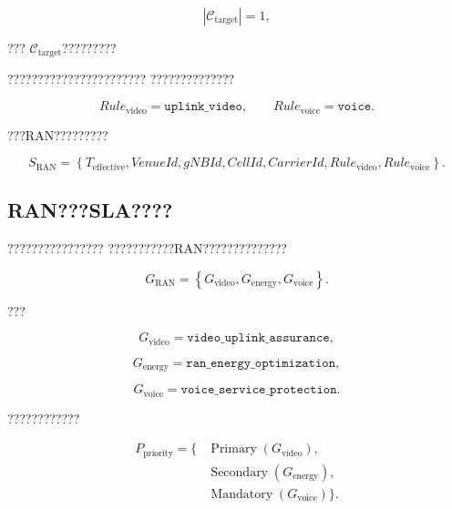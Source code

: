 \begin{equation}
\left|
\mathcal{C}_{\mathrm{target}}
\right|
=
1,
\label{eq:single_cell_scope}
\end{equation}

???
$\mathcal{C}_{\mathrm{target}}$?????????

???????????????????????
??????????????

\begin{equation}
Rule_{\mathrm{video}}
=
\texttt{uplink\_video},
\qquad
Rule_{\mathrm{voice}}
=
\texttt{voice}.
\label{eq:translated_user_rules}
\end{equation}

???RAN?????????

\begin{equation}
S_{\mathrm{RAN}}
=
\left\{
T_{\mathrm{effective}},
VenueId,
gNBId,
CellId,
CarrierId,
Rule_{\mathrm{video}},
Rule_{\mathrm{voice}}
\right\}.
\label{eq:ran_scope_result}
\end{equation}


\subsection*{RAN???SLA????}

????????????????
???????????RAN??????????????

\begin{equation}
G_{\mathrm{RAN}}
=
\left\{
G_{\mathrm{video}},
G_{\mathrm{energy}},
G_{\mathrm{voice}}
\right\}.
\label{eq:translated_ran_objectives}
\end{equation}

???

\begin{equation}
G_{\mathrm{video}}
=
\texttt{video\_uplink\_assurance},
\label{eq:video_assurance_objective}
\end{equation}

\begin{equation}
G_{\mathrm{energy}}
=
\texttt{ran\_energy\_optimization},
\label{eq:energy_optimization_objective}
\end{equation}

\begin{equation}
G_{\mathrm{voice}}
=
\texttt{voice\_service\_protection}.
\label{eq:voice_protection_objective}
\end{equation}

????????????

\begin{equation}
\begin{aligned}
P_{\mathrm{priority}}
=
\{
&\operatorname{Primary}
(G_{\mathrm{video}}),
\\
&\operatorname{Secondary}
(G_{\mathrm{energy}}),
\\
&\operatorname{Mandatory}
(G_{\mathrm{voice}})
\}.
\end{aligned}
\label{eq:translated_objective_priority}
\end{equation}

